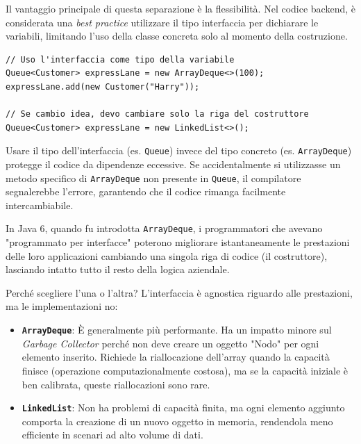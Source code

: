 Il vantaggio principale di questa separazione è la flessibilità. Nel codice backend, è considerata una \textit{best practice} utilizzare il tipo interfaccia per dichiarare le variabili, limitando l'uso della classe concreta solo al momento della costruzione.

\begin{lstlisting}[caption={Utilizzo corretto delle interfacce}]
// Uso l'interfaccia come tipo della variabile
Queue<Customer> expressLane = new ArrayDeque<>(100);
expressLane.add(new Customer("Harry"));

// Se cambio idea, devo cambiare solo la riga del costruttore
Queue<Customer> expressLane = new LinkedList<>();
\end{lstlisting}

\begin{bestpractice}
Usare il tipo dell'interfaccia (es. \texttt{Queue}) invece del tipo concreto (es. \texttt{ArrayDeque}) protegge il codice da dipendenze eccessive. Se accidentalmente si utilizzasse un metodo specifico di \texttt{ArrayDeque} non presente in \texttt{Queue}, il compilatore segnalerebbe l'errore, garantendo che il codice rimanga facilmente intercambiabile.

In Java 6, quando fu introdotta \texttt{ArrayDeque}, i programmatori che avevano "programmato per interfacce" poterono migliorare istantaneamente le prestazioni delle loro applicazioni cambiando una singola riga di codice (il costruttore), lasciando intatto tutto il resto della logica aziendale.
\end{bestpractice}

Perché scegliere l'una o l'altra? L'interfaccia è agnostica riguardo alle prestazioni, ma le implementazioni no:

\begin{itemize}
    \item \textbf{\texttt{ArrayDeque}}: È generalmente più performante. Ha un impatto minore sul \textit{Garbage Collector} perché non deve creare un oggetto "Nodo" per ogni elemento inserito. Richiede la riallocazione dell'array quando la capacità finisce (operazione computazionalmente costosa), ma se la capacità iniziale è ben calibrata, queste riallocazioni sono rare. 
    \item \textbf{\texttt{LinkedList}}: Non ha problemi di capacità finita, ma ogni elemento aggiunto comporta la creazione di un nuovo oggetto in memoria, rendendola meno efficiente in scenari ad alto volume di dati.
\end{itemize}

